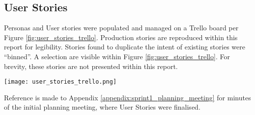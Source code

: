 \subsection{User Stories}

Personas and User stories were populated and managed on a Trello board per Figure \ref{fig:user_stories_trello}.
Production stories are reproduced within this report for legibility.
Stories found to duplicate the intent of existing stories were ``binned''. 
A selection are visible within Figure \ref{fig:user_stories_trello}. For brevity, these stories are not presented within this report.

\begin{center}
	\texttt{[image: user\_stories\_trello.png]}
	\label{fig:user_stories_trello}
\end{center}

Reference is made to Appendix \ref{appendix:sprint1_planning_meeting} for minutes of the initial planning meeting, where User Stories were finalised.
